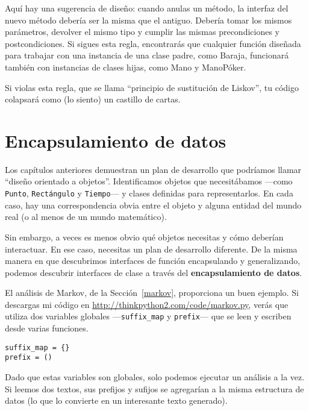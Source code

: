 \documentclass[10pt]{book}
\begin{document}
Aquí hay una sugerencia de diseño: cuando anulas un método,
la interfaz del nuevo método debería ser la misma que el antiguo.  Debería
tomar los mismos parámetros, devolver el mismo tipo y cumplir las
mismas precondiciones y postcondiciones.  Si sigues esta regla,
encontrarás que cualquier función diseñada para trabajar con una instancia de una
clase padre, como Baraja, funcionará también con instancias de
clases hijas, como Mano y ManoPóker.

Si violas esta regla, que se llama ``principio de sustitución
de Liskov'', tu código colapsará como (lo siento) un castillo de cartas.


\section{Encapsulamiento de datos}

Los capítulos anteriores demuestran un plan de desarrollo que podríamos llamar
``diseño orientado a objetos''.  Identificamos objetos que necesitábamos ---como
{\tt Punto}, {\tt Rectángulo} y {\tt Tiempo}--- y clases definidas para
representarlos.  En cada caso, hay una correspondencia obvia
entre el objeto y alguna entidad del mundo real (o al menos de un
mundo matemático).

Sin embargo, a veces es menos obvio qué objetos necesitas
y cómo deberían interactuar.  En ese caso, necesitas un plan de desarrollo
diferente.  De la misma manera en que descubrimos interfaces
de función encapsulando y generalizando, podemos descubrir
interfaces de clase a través del {\bf encapsulamiento de datos}.

El análisis de Markov, de la Sección~\ref{markov}, proporciona un buen ejemplo.
Si descargas mi código en \url{http://thinkpython2.com/code/markov.py},
verás que utiliza dos variables globales ---\verb"suffix_map" y
\verb"prefix"--- que se leen y escriben desde varias funciones.

\begin{verbatim}
suffix_map = {}
prefix = ()
\end{verbatim}

Dado que estas variables son globales, solo podemos ejecutar un análisis a la
vez.  Si leemos dos textos, sus prefijos y sufijos se
agregarían a la misma estructura de datos (lo que lo convierte en un interesante
texto generado).
\end{document}
